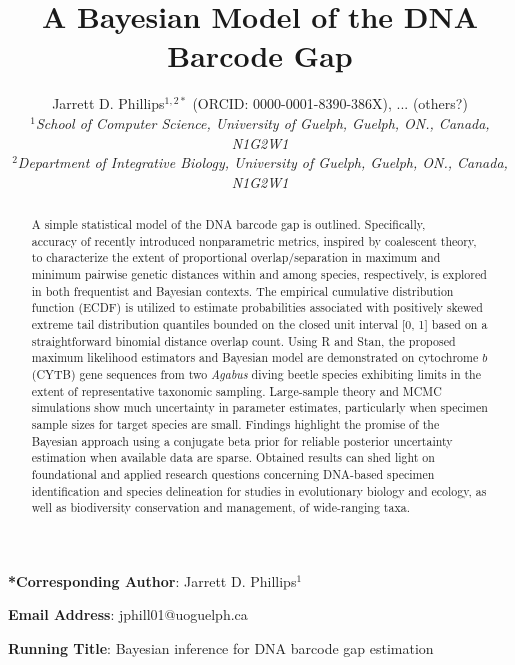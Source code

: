 \documentclass[12pt]{article}
\makeatletter
\renewcommand{\maketitle}{\bgroup\setlength{\parindent}{0pt}
\begin{flushleft}
\textbf{\@title}

  \@author
\end{flushleft}\egroup
}
\makeatother
\begin{document}
\linenumbers

\title{A Bayesian Model of the DNA Barcode Gap}

\author{Jarrett D. Phillips$^{1, 2*}$ (ORCID: 0000-0001-8390-386X), ... (others?)  \\
\textit{$^1$School of Computer Science, University of Guelph, Guelph, ON., Canada, N1G2W1} \\ \textit{$^2$Department of Integrative Biology, University of Guelph, Guelph, ON., Canada, N1G2W1} }

\date{}

\maketitle

\vspace{2mm}

\noindent \textbf{*Corresponding Author}: Jarrett D. Phillips$^{1}$

\noindent \textbf{Email Address}: jphill01@uoguelph.ca

\noindent \textbf{Running Title}: Bayesian inference for DNA barcode gap estimation

\newpage

\begin{abstract}

A simple statistical model of the DNA barcode gap is outlined. Specifically, \\ accuracy of recently introduced nonparametric metrics, inspired by coalescent theory, to characterize the extent of proportional overlap/separation in maximum and minimum pairwise genetic distances within and among species, respectively, is explored in both frequentist and Bayesian contexts. The empirical cumulative distribution function (ECDF) is utilized to estimate probabilities associated with positively skewed extreme tail distribution quantiles bounded on the closed unit interval [0, 1] based on a \\ straightforward binomial distance overlap count. Using R and Stan, the proposed maximum likelihood estimators and Bayesian model are demonstrated on cytochrome $b$ (CYTB) gene sequences from two \textit{Agabus} diving beetle species exhibiting limits in the extent of representative taxonomic sampling. Large-sample theory and MCMC simulations show much uncertainty in parameter estimates, particularly when specimen sample sizes for target species are small. Findings highlight the promise of the Bayesian approach using a conjugate beta prior for reliable posterior uncertainty estimation when available data are sparse. Obtained results can shed light on foundational and applied research questions concerning DNA-based specimen identification and species delineation for studies in evolutionary biology and ecology, as well as biodiversity conservation and management, of wide-ranging taxa.

\end{abstract}
\end{document}
